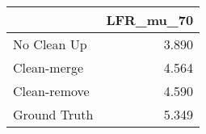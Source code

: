 \begin{tabular}{lr}
\toprule
{} & LFR_mu_70 \\
\midrule
No Clean Up  &     3.890 \\
Clean-merge  &     4.564 \\
Clean-remove &     4.590 \\
Ground Truth &     5.349 \\
\bottomrule
\end{tabular}
